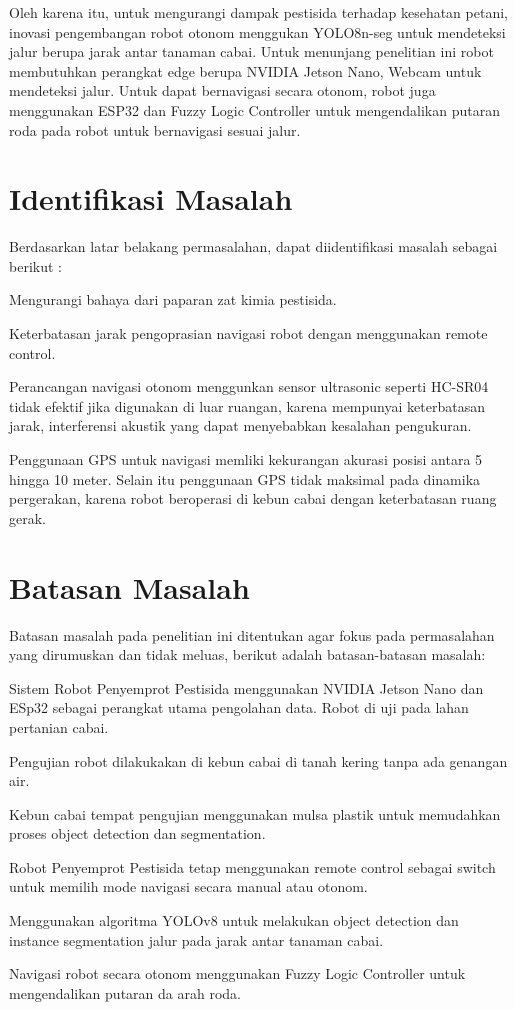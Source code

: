 Oleh karena itu, untuk mengurangi dampak pestisida terhadap kesehatan petani, inovasi pengembangan robot otonom  menggukan YOLO8n-seg untuk mendeteksi jalur berupa jarak antar tanaman cabai. Untuk menunjang penelitian ini robot  membutuhkan perangkat edge berupa NVIDIA Jetson Nano, Webcam untuk mendeteksi jalur. Untuk dapat bernavigasi secara otonom, robot juga menggunakan ESP32 dan Fuzzy Logic Controller untuk mengendalikan putaran roda pada robot untuk bernavigasi sesuai jalur. 

\section{Identifikasi Masalah}
Berdasarkan latar belakang permasalahan, dapat diidentifikasi masalah
sebagai berikut :
\begin{packed_enum}
	\item Mengurangi bahaya dari paparan zat kimia pestisida.
	\item Keterbatasan jarak pengoprasian navigasi robot dengan menggunakan remote control.
	\item Perancangan navigasi otonom menggunkan sensor ultrasonic seperti HC-SR04 tidak efektif jika digunakan di luar ruangan, karena mempunyai keterbatasan jarak, interferensi akustik yang dapat menyebabkan kesalahan pengukuran.
	\item Penggunaan GPS untuk navigasi memliki kekurangan akurasi posisi antara 5 hingga 10 meter. Selain itu penggunaan GPS tidak maksimal pada dinamika pergerakan, karena robot beroperasi di kebun cabai dengan keterbatasan ruang gerak.
\end{packed_enum}

\section{Batasan Masalah}
Batasan masalah pada penelitian ini ditentukan agar fokus pada permasalahan
yang dirumuskan dan tidak meluas, berikut adalah batasan-batasan masalah:
\begin{packed_enum}
	\item Sistem Robot Penyemprot Pestisida menggunakan NVIDIA Jetson Nano dan ESp32 sebagai perangkat utama pengolahan data. Robot di uji pada lahan pertanian cabai.
	\item Pengujian robot dilakukakan di kebun cabai di tanah kering tanpa ada genangan air.
	\item Kebun cabai tempat pengujian menggunakan mulsa plastik untuk memudahkan proses object detection dan segmentation.
	\item Robot Penyemprot Pestisida tetap menggunakan remote control
	sebagai switch untuk memilih mode navigasi secara manual atau otonom.
	\item Menggunakan algoritma YOLOv8 untuk melakukan object detection dan instance segmentation jalur pada jarak antar tanaman cabai.
	\item Navigasi robot secara otonom menggunakan Fuzzy Logic Controller untuk mengendalikan putaran da arah roda.
\end{packed_enum}


